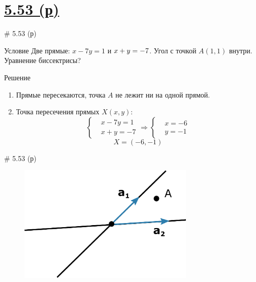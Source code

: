 \documentclass[russian]{beamer}
\begin{document}
    
  \section{\uline{5.53 (р)}}
  
  \begin{frame}{\# 5.53 (р)}
    
    \begin{block}{Условие}
      Две прямые: $x - 7y = 1$ и $x + y \hm= -7$.
      Угол с точкой $A(1, 1)$ внутри.
      Уравнение биссектрисы?
    \end{block}
    
    \pause
    
    \begin{block}{Решение}
      \begin{enumerate}
        \item Прямые пересекаются, точка $A$ не лежит ни на одной прямой.
        
        \item Точка пересечения прямых $X(x, y)$:
        \[
          \left\{\begin{aligned}
            &x - 7y = 1\\
            &x + y = -7
          \end{aligned}\right.
          \Rightarrow
          \left\{\begin{aligned}
            &x = -6\\
            &y = -1
          \end{aligned}\right.
        \]
        \[
          \boxed{X = (-6, -1)}
        \]
      \end{enumerate}
    \end{block}
  \end{frame}
    

  \begin{frame}{\# 5.53 (р)}
    \begin{figure}
      \centering
      \includegraphics[width=0.75\textwidth]{5-53}
    \end{figure}
  \end{frame}
\end{document}
